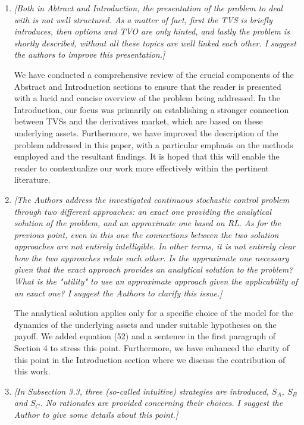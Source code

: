 \documentclass{article}
\begin{document}
\begin{enumerate}

 \item \textit{[Both in Abtract and Introduction, the presentation of the problem to deal with is not well structured. As a matter of fact, first the TVS is briefly introduces, then options and TVO are only hinted, and lastly the problem is shortly described, without all these topics are well linked each other. I suggest the authors to improve this presentation.]}

 We have conducted a comprehensive review of the crucial components of the Abstract and Introduction sections to ensure that the reader is presented with a lucid and concise overview of the problem being addressed. In the Introduction, our focus was primarily on establishing a stronger connection between TVSs and the derivatives market, which are based on these underlying assets. Furthermore, we have improved the description of the problem addressed in this paper, with a particular emphasis on the methods employed and the resultant findings. It is hoped that this will enable the reader to contextualize our work more effectively within the pertinent literature.

 \item \textit{[The Authors address the investigated continuous stochastic control problem through two different approaches: an exact one providing the analytical solution of the problem, and an approximate one based on RL. As for the previous point, even in this one the connections between the two solution approaches are not entirely intelligible. In other terms, it is not entirely clear how the two approaches relate each other. Is the approximate one necessary given that the exact approach provides an analytical solution to the problem? What is the "utility" to use an approximate approach given the applicability of an exact one? I suggest the Authors to clarify this issue.]} 
 
The analytical solution applies only for a specific choice of the model for the dynamics of the underlying  assets and under suitable hypotheses on the payoff. We added equation (52) and a sentence in the first paragraph of Section 4 to stress this point. Furthermore, we have enhanced the clarity of this point in the Introduction section where we discuss the contribution of this work.

 \item \textit{[In Subsection 3.3, three (so-called intuitive) strategies are introduced, $S_A$, $S_B$ and $S_C$. No rationales are provided concerning their choices. I suggest the Author to give some details about this point.]}


\end{enumerate}
\end{document}
